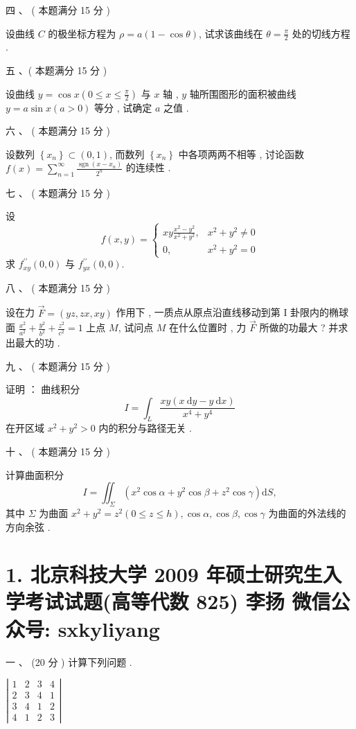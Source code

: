 \documentclass[10pt]{article}
\begin{document}
{ 四 、 ( 本题满分  15  分 )

 设曲线  $C$  的极坐标方程为  $\rho=a(1-\cos \theta)$,  试求该曲线在  $\theta=\frac{\pi}{2}$  处的切线方程 .

 五 、( 本题满分  15  分 )

 设曲线  $y=\cos x\left(0 \leqslant x \leqslant \frac{\pi}{2}\right)$  与  $x$  轴 , $y$  轴所围图形的面积被曲线  $y=a \sin x(a>0)$  等分 ,  试确定  $a$  之值 .

 六 、 ( 本题满分  15  分 )

 设数列  $\left\{x_{n}\right\} \subset(0,1)$,  而数列  $\left\{x_{n}\right\}$  中各项两两不相等 ,  讨论函数  $f(x)=\sum_{n=1}^{\infty} \frac{\operatorname{sgn}\left(x-x_{n}\right)}{2^{n}}$  的连续性 .

 七 、 ( 本题满分  15  分 )

 设 
$$
f(x, y)= \begin{cases}x y \frac{x^{2}-y^{2}}{x^{2}+y^{2}}, & x^{2}+y^{2} \neq 0 \\ 0, & x^{2}+y^{2}=0\end{cases}
$$
 求  $f_{x y}^{\prime \prime}(0,0)$  与  $f_{y x}^{\prime \prime}(0,0)$.

 八 、 ( 本题满分  15  分 )

 设在力  $\vec{F}=(y z, z x, x y)$  作用下 ,  一质点从原点沿直线移动到第  I  卦限内的椭球面  $\frac{x^{2}}{a^{2}}+\frac{y^{2}}{b^{2}}+\frac{z^{2}}{c^{2}}=1$  上点  $M$,  试问点  $M$  在什么位置时 ,  力  $\vec{F}$  所做的功最大 ?  并求出最大的功 .

 九 、 ( 本题满分  15  分 )

 证明 ： 曲线积分 
$$
I=\int_{L} \frac{x y(x \mathrm{~d} y-y \mathrm{~d} x)}{x^{4}+y^{4}}
$$
 在开区域  $x^{2}+y^{2}>0$  内的积分与路径无关 .

 十 、 ( 本题满分  15  分 )

 计算曲面积分 
$$
I=\iint_{\Sigma}\left(x^{2} \cos \alpha+y^{2} \cos \beta+z^{2} \cos \gamma\right) \mathrm{d} S,
$$
 其中  $\Sigma$  为曲面  $x^{2}+y^{2}=z^{2}(0 \leqslant z \leqslant h), \cos \alpha, \cos \beta, \cos \gamma$  为曲面的外法线的方向余弦 .

\section{1. 北京科技大学 2009 年硕士研究生入学考试试题(高等代数 825) 
 李扬 
 微信公众号: sxkyliyang}
 一 、 (20  分 )  计算下列问题 .

$\left|\begin{array}{llll}1 & 2 & 3 & 4 \\ 2 & 3 & 4 & 1 \\ 3 & 4 & 1 & 2 \\ 4 & 1 & 2 & 3\end{array}\right|$

}
\end{document}
